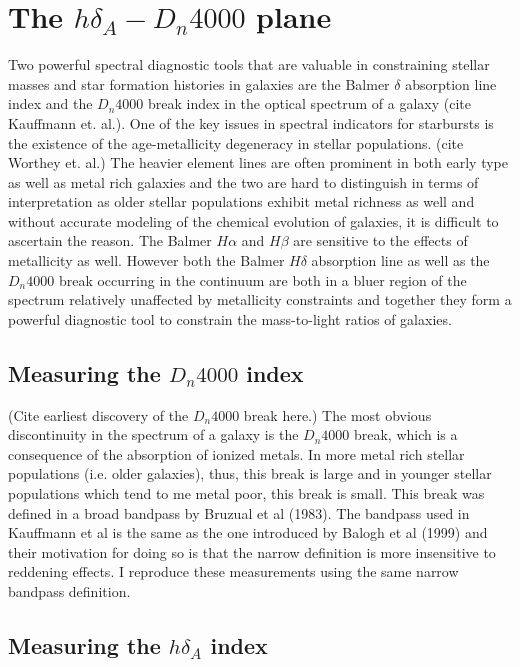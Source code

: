 \section{The $h\delta_{A}-D_{n}4000$ plane}

Two powerful spectral diagnostic tools that are valuable in constraining stellar masses and star formation histories in galaxies are the Balmer $\delta$ absorption line index and the $D_{n}4000$ break index in the optical spectrum of a galaxy (cite Kauffmann et. al.). One of the key issues in spectral indicators for starbursts is the existence of the age-metallicity degeneracy in stellar populations. (cite Worthey et. al.) The heavier element lines are often prominent in both early type as well as metal rich galaxies and the two are hard to distinguish in terms of interpretation as older stellar populations exhibit metal richness as well and without accurate modeling of the chemical evolution of galaxies, it is difficult to ascertain the reason. The Balmer $H\alpha$ and $H\beta$ are sensitive to the effects of metallicity as well. However both the Balmer $H\delta$ absorption line as well as the $D_{n}4000$ break occurring in the continuum are both in a bluer region of the spectrum relatively unaffected by metallicity constraints and together they form a powerful diagnostic tool to constrain the mass-to-light ratios of galaxies. 

\subsection{Measuring the $D_{n}4000$ index}
(Cite earliest discovery of the $D_{n}4000$ break here.)  The most obvious discontinuity in the spectrum of a galaxy is the $D_{n}4000$ break, which is a consequence of the absorption of ionized metals. In more metal rich stellar populations (i.e. older galaxies), thus, this break is large and in younger stellar populations which tend to me metal poor, this break is small. This break was defined in a broad bandpass by Bruzual et al (1983). The bandpass used in Kauffmann et al is the same as the one introduced by Balogh et al (1999) and their motivation for doing so is that the narrow definition is more insensitive to reddening effects. I reproduce these measurements using the same narrow bandpass definition.


\subsection{Measuring the $h\delta_{A}$ index}

